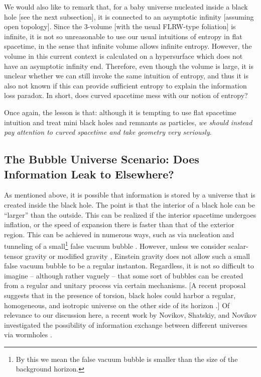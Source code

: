 \documentclass[12pt]{article}
\newcommand{\2}{$^2$}
\newcommand{\3}{$^3$}
\newcommand{\4}{$_4$}
\newcommand{\5}{$_5$}
\begin{document}
{\color{black}We would also like to remark that, for a baby universe nucleated inside a black hole [see the next subsection], it is connected to an asymptotic infinity [assuming open topology]. Since the 3-volume [with the usual FLRW-type foliation] is infinite, it is not so unreasonable to use our usual intuitions of entropy in flat spacetime, in the sense that infinite volume allows infinite entropy. However, the volume in this current context is calculated on a hypersurface which does not have an asymptotic infinity end. Therefore, even though the volume is large, it is unclear whether we can still invoke the same intuition of entropy, and thus it is also not known if this can provide sufficient entropy to explain the information loss paradox. In short, does curved spacetime mess with our notion of entropy?}

Once again, the lesson is that:  although it is tempting to use flat spacetime intuition and treat mini black holes and remnants as particles, \emph{we should instead pay attention to curved spacetime and take geometry very seriously}.

\subsection{The Bubble Universe Scenario: Does Information Leak to Elsewhere?}

As mentioned above, it is possible that information is stored by a universe that is created inside the black hole. The point is that the interior of a black hole can be ``larger'' than the outside. This can be realized if the interior spacetime undergoes inflation, or the speed of expansion there is faster than that of  the exterior region. This can be achieved in numerous ways, such as via nucleation and tunneling of a small\footnote{By this we mean the false vacuum bubble is smaller than the size of the background horizon.} false vacuum bubble \cite{Blau:1986cw,Farhi:1989yr}. However, unless we consider scalar-tensor gravity or modified gravity \cite{Kim:2010yr}, Einstein gravity does not allow such a small false vacuum bubble to be a regular instanton. Regardless, it is not so difficult to imagine -- although rather vaguely -- that some sort of bubbles can be created from a regular and unitary process via certain mechanisms. [A recent proposal suggests that in the presence of torsion, black holes could harbor a regular, homogeneous, and isotropic universe on the other side of its horizon \cite{Poplawski}.] Of relevance to our discussion here, a recent work by Novikov, Shatskiy, and Novikov investigated the possibility of information exchange between different universes via wormholes \cite{NSN}.
\end{document}

